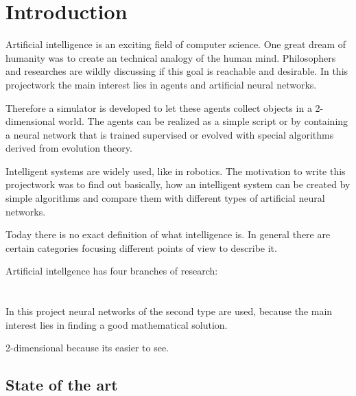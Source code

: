\documentclass[10pt,a4paper,DIV=11]{scrreprt}
\begin{document}
\chapter{Introduction}
Artificial intelligence is an exciting field of computer science. One great dream of humanity was to create an technical analogy of the human mind.
Philosophers and researches are wildly discussing if this goal is reachable and desirable.
In this projectwork the main interest lies in agents and artificial neural networks.

Therefore a simulator is developed to let these agents collect objects in a 2-dimensional world. The agents can be realized as a simple script or by containing a neural network that is trained supervised or evolved with special algorithms derived from evolution theory.



Intelligent systems are widely used, like in robotics.
The motivation to write this projectwork was
to find out basically, how an intelligent system can be created by simple algorithms and compare them with different types of artificial neural networks.

Today there is no exact definition of what intelligence is.
In general there are certain categories focusing different points of view to describe it.


Artificial intellgence has four branches of research: \\

   \\
\\


In this project neural networks of the second type are used, because the main interest lies in finding a good mathematical solution.

2-dimensional because its easier to see.

\section{State of the art}
\end{document}
